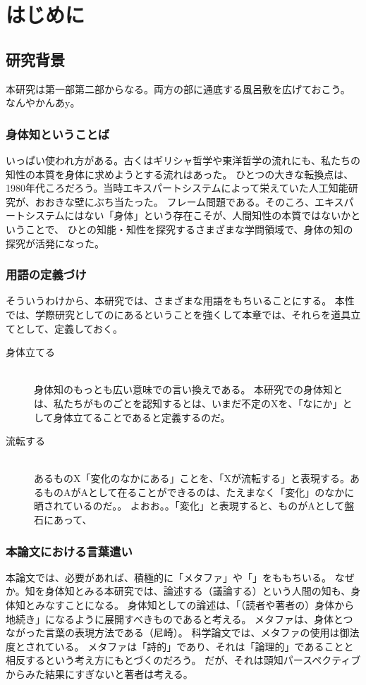 \part*{はじめに}
\chapter{研究背景}
本研究は第一部第二部からなる。両方の部に通底する風呂敷を広げておこう。
なんやかんあy。
\section{身体知ということば}
いっぱい使われ方がある。古くはギリシャ哲学や東洋哲学の流れにも、私たちの知性の本質を身体に求めようとする流れはあった。
ひとつの大きな転換点は、1980年代ころだろう。当時エキスパートシステムによって栄えていた人工知能研究が、おおきな壁にぶち当たった。
フレーム問題である。そのころ、エキスパートシステムにはない「身体」という存在こそが、人間知性の本質ではないかということで、
ひとの知能・知性を探究するさまざまな学問領域で、身体の知の探究が活発になった。

\section{用語の定義づけ}
そういうわけから、本研究では、さまざまな用語をもちいることにする。
本性では、学際研究としてのにあるということを強くして本章では、それらを道具立てとして、定義しておく。

\begin{description}
  \item [身体立てる]\mbox{}\\
  身体知のもっとも広い意味での言い換えである。  
  本研究での身体知とは、私たちがものごとを認知するとは、いまだ不定のXを、「なにか」として身体立てることであると定義するのだ。  
  \item[流転する]\mbox{}\\
  あるものX「変化のなかにある」ことを、「Xが流転する」と表現する。あるものAがAとして在ることができるのは、たえまなく「変化」のなかに晒されているのだ。。
  よおお。。「変化」と表現すると、ものがAとして盤石にあって、
  
\end{description}

\section{本論文における言葉遣い}
本論文では、必要があれば、積極的に「メタファ」や「」をももちいる。
なぜか。知を身体知とみる本研究では、論述する（議論する）という人間の知も、身体知とみなすことになる。
身体知としての論述は、「（読者や著者の）身体から地続き」になるように展開すべきものであると考える。
メタファは、身体とつながった言葉の表現方法である（尼崎）。
科学論文では、メタファの使用は御法度とされている。
メタファは「詩的」であり、それは「論理的」であることと相反するという考え方にもとづくのだろう。
だが、それは頭知パースペクティブからみた結果にすぎないと著者は考える。

